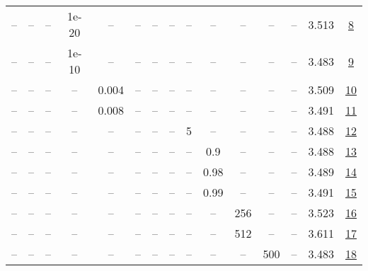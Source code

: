 \begin{table}[H]
\begin{tabular}{ccccccccccccccc}
-- & -- & -- & 1e-20 & -- & -- & -- & -- & -- & -- & -- & -- & -- & 3.513 & \href{https://wandb.ai/stanford-mercury/optimizer-scaling/runs/sweep-130m-2B-soapl69eb3flr0.016-wd0.1-minlr0-warmup1000-b10.95--7af120}{8} \\
-- & -- & -- & 1e-10 & -- & -- & -- & -- & -- & -- & -- & -- & -- & 3.483 & \href{https://wandb.ai/stanford-mercury/optimizer-scaling/runs/sweep-130m-2B-soapl8873b6lr0.016-wd0.1-minlr0-warmup1000-b10.95--0732e5}{9} \\
-- & -- & -- & -- & 0.004 & -- & -- & -- & -- & -- & -- & -- & -- & 3.509 & \href{https://wandb.ai/stanford-mercury/optimizer-scaling/runs/sweep-130m-2B-soapl307a66lr0.004-wd0.1-minlr0-warmup1000-b10.95--2679d5}{10} \\
-- & -- & -- & -- & 0.008 & -- & -- & -- & -- & -- & -- & -- & -- & 3.491 & \href{https://wandb.ai/stanford-mercury/optimizer-scaling/runs/sweep-130m-2B-soapld74347lr0.008-wd0.1-minlr0-warmup1000-b10.95--d32f3b}{11} \\
-- & -- & -- & -- & -- & -- & -- & -- & 5 & -- & -- & -- & -- & 3.488 & \href{https://wandb.ai/stanford-mercury/optimizer-scaling/runs/sweep-130m-2B-soapa6f299lr0.016-wd0.1-minlr0-warmup1000-b10.95-b-7cc556}{12} \\
-- & -- & -- & -- & -- & -- & -- & -- & -- & 0.9 & -- & -- & -- & 3.488 & \href{https://wandb.ai/stanford-mercury/optimizer-scaling/runs/sweep-130m-2B-soapl4361f2lr0.016-wd0.1-minlr0-warmup1000-b10.95--2ad60c}{13} \\
-- & -- & -- & -- & -- & -- & -- & -- & -- & 0.98 & -- & -- & -- & 3.489 & \href{https://wandb.ai/stanford-mercury/optimizer-scaling/runs/sweep-130m-2B-soapl1db4cblr0.016-wd0.1-minlr0-warmup1000-b10.95--88f9b3}{14} \\
-- & -- & -- & -- & -- & -- & -- & -- & -- & 0.99 & -- & -- & -- & 3.491 & \href{https://wandb.ai/stanford-mercury/optimizer-scaling/runs/sweep-130m-2B-soapl2e5bdclr0.016-wd0.1-minlr0-warmup1000-b10.95--e8f7e3}{15} \\
-- & -- & -- & -- & -- & -- & -- & -- & -- & -- & 256 & -- & -- & 3.523 & \href{https://wandb.ai/stanford-mercury/optimizer-scaling/runs/sweep-130m-2B-soapl601977lr0.016-wd0.1-minlr0-warmup1000-b10.95--3feb67}{16} \\
-- & -- & -- & -- & -- & -- & -- & -- & -- & -- & 512 & -- & -- & 3.611 & \href{https://wandb.ai/stanford-mercury/optimizer-scaling/runs/sweep-130m-2B-soapl47dbfblr0.016-wd0.1-minlr0-warmup1000-b10.95--cccc39}{17} \\
-- & -- & -- & -- & -- & -- & -- & -- & -- & -- & -- & 500 & -- & 3.483 & \href{https://wandb.ai/stanford-mercury/optimizer-scaling/runs/sweep-130m-2B-soapl0c1650lr0.016-wd0.1-minlr0-warmup500-b10.95-b-5b4c4b}{18} \\

\end{tabular}
\end{table}
